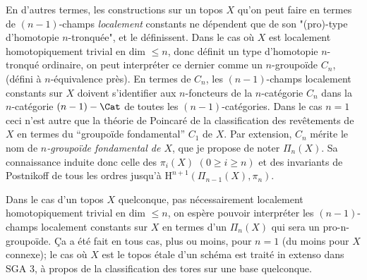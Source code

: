 En d’autres termes, les constructions sur un topos $X$ qu'on peut faire en termes de $(n-1)$-champs \emph{localement} constants ne dépendent que de son "(pro)-type d’homotopie $n$-tronquée", et le définissent. Dans le cas où $X$ est localement homotopiquement trivial en dim $\leq n$, donc définit un type d’homotopie $n$-tronqué ordinaire, on peut interpréter ce dernier comme un $n$-groupoïde $C_n$, (défini à $n$-équivalence près). En termes de $C_n$, les $(n-1)$-champs localement constants sur $X$ doivent s’identifier aux $n$-foncteurs de la $n$-catégorie $C_n$ dans la $n$-catégorie $(n-1)-\Cat$ de toutes les $(n-1)$-catégories. Dans le cas $n = 1$ ceci n’est autre que la théorie de Poincaré de la classification des revêtements de $X$ en termes du ``groupoïde fondamental'' $C_1$ de $X$. Par extension, $C_n$ mérite le nom de \emph{$n$-groupoïde fondamental de $X$}, que je propose de noter $\Pi_n(X)$. Sa connaissance induite donc celle des $\pi_i(X)$ $(0 \geq i \geq n)$ et des invariants de Postnikoff de tous les ordres jusqu’à $\mathrm H^{n+1}(\Pi_{n-1}(X), \pi_n)$.

Dans le cas d’un topos $X$  quelconque, pas nécessairement localement homotopiquement trivial en dim $\leq n$, on espère pouvoir interpréter les $(n-1)$-champs localement constants sur $X$ en termes d’un $\Pi_n(X)$ qui sera un pro-n-groupoïde. Ça a été fait en tous cas, plus ou moins, pour $n = 1$ (du moins pour $X$ connexe); le cas où $X$ est le topos étale d’un schéma est traité in extenso dans SGA 3, à propos de la classification des tores sur une base quelconque. 

